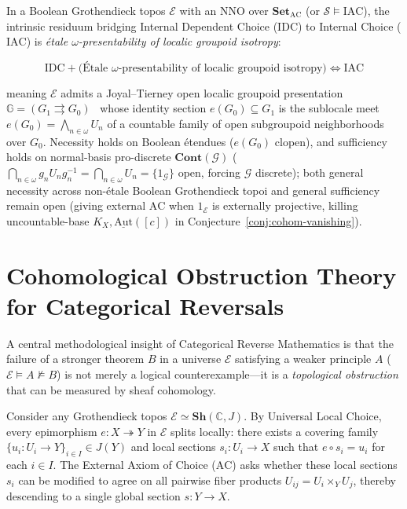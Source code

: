\begin{conjecture}\label{conj:dc-ac}

In a Boolean Grothendieck topos $\mathcal{E}$ with an $\mathrm{NNO}$ over $\mathbf{Set}_{\mathrm{AC}}$ (or $\mathcal{S} \models \mathrm{IAC}$), the intrinsic residuum bridging Internal Dependent Choice ($\mathrm{IDC}$) to Internal Choice ($\mathrm{IAC}$) is \emph{\'etale $\omega$-presentability of localic groupoid isotropy}:

\[
  \mathrm{IDC} + \bigl(\text{\'Etale } \omega\text{-presentability of localic groupoid isotropy}\bigr) \iff \mathrm{IAC}
\]

meaning $\mathcal{E}$ admits a Joyal--Tierney open localic groupoid presentation $\mathbb{G} = (G_1 \rightrightarrows G_0)$~\cite[\S C5.3]{Johnstone02} whose identity section $e(G_0) \subseteq G_1$ is the sublocale meet $e(G_0) = \bigwedge_{n \in \omega} U_n$ of a countable family of open subgroupoid neighborhoods over $G_0$. Necessity holds on Boolean \'etendues ($e(G_0)$ clopen), and sufficiency holds on normal-basis pro-discrete $\mathbf{Cont}(\mathcal{G})$ ($\bigcap_{n \in \omega} g_n U_n g_n^{-1} = \bigcap_{n \in \omega} U_n = \{1_{\mathcal{G}}\}$ open, forcing $\mathcal{G}$ discrete); both general necessity across non-\'etale Boolean Grothendieck topoi and general sufficiency remain open (giving external $\mathrm{AC}$ when $1_{\mathcal{E}}$ is externally projective, killing uncountable-base $K_X, \underline{\mathrm{Aut}}([c])$ in Conjecture~\ref{conj:cohom-vanishing}).

\end{conjecture}

\section{Cohomological Obstruction Theory for Categorical Reversals}

A central methodological insight of Categorical Reverse Mathematics is that the failure of a stronger theorem $B$ in a universe $\mathcal{E}$ satisfying a weaker principle $A$ ($\mathcal{E} \models A \not\models B$) is not merely a logical counterexample---it is a \emph{topological obstruction} that can be measured by sheaf cohomology.

Consider any Grothendieck topos $\mathcal{E} \simeq \mathbf{Sh}(\mathbb{C}, J)$. By Universal Local Choice, every epimorphism $e: X \twoheadrightarrow Y$ in $\mathcal{E}$ splits locally: there exists a covering family $\{u_i: U_i \to Y\}_{i \in I} \in J(Y)$ and local sections $s_i: U_i \to X$ such that $e \circ s_i = u_i$ for each $i \in I$. The External Axiom of Choice ($\mathrm{AC}$) asks whether these local sections $s_i$ can be modified to agree on all pairwise fiber products $U_{ij} = U_i \times_Y U_j$, thereby descending to a single global section $s: Y \to X$.

